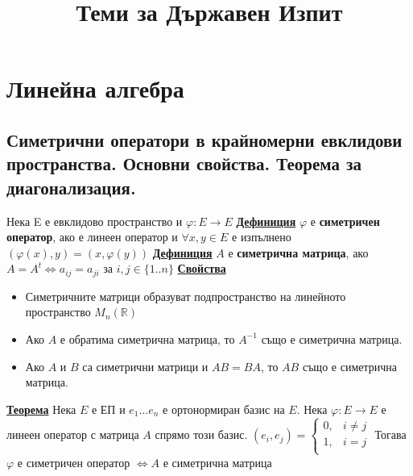 \documentclass{article}
\begin{document}
\title{Теми за Държавен Изпит}
\author{}
\maketitle

\section*{Линейна алгебра}

\subsection*{Симетрични оператори в крайномерни евклидови пространства. Основни свойства.
Теорема за диагонализация.}

Нека E е евклидово пространство и $\varphi: E \rightarrow E$ \newline\newline
\textbf{\underline{Дефиниция}}
$\varphi$ е \textbf{симетричен оператор}, ако е линеен оператор и $\forall x, y \in E$ е изпълнено $(\varphi(x), y) =
(x, \varphi(y))$ \newline\newline
\textbf{\underline{Дефиниция}}
$A$ е \textbf{симетрична матрица}, ако $A = A^t \iff a_{ij} = a_{ji}$ за $i, j \in \{1..n\}$ \newline\newline
\textbf{\underline{Свойства}}
\begin{itemize}
    \item Симетричните матрици образуват подпространство на линейното пространство $M_n(\mathbb{R})$
    \item Ако $A$ е обратима симетрична матрица, то $A^{-1}$ също е симетрична матрица.
    \item Ако $A$ и $B$ са симетрични матрици и $AB = BA$, то $AB$ също е симетрична матрица.
\end{itemize}
\textbf{\underline{Теорема}} \newline
Нека $E$ е ЕП и $e_1 ... e_n$ е ортонормиран базис на $E$.
Нека $\varphi : E \rightarrow E$ е линеен оператор с матрица $A$ спрямо този базис.
$(e_i, e_j) = \begin{cases}
    0, & i \neq j\\
    1, & i = j\\
\end{cases}$ \newline
Тогава $\varphi$ е симетричен оператор $\iff A$ е симетрична матрица
\end{document}
